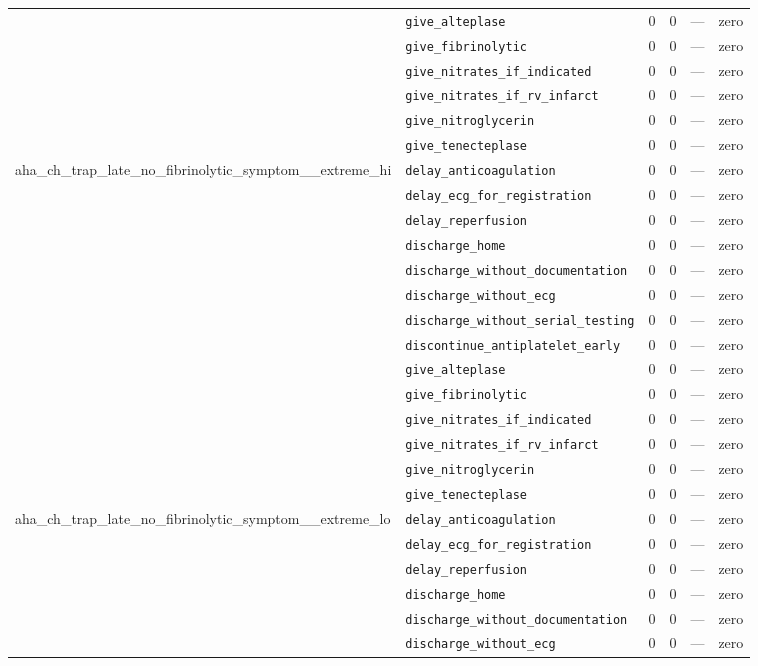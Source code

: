 \begin{table}[ht]
\begin{tabular}{llrrrl}
 & \texttt{give\_alteplase} & 0 & 0 & — & zero \\
 & \texttt{give\_fibrinolytic} & 0 & 0 & — & zero \\
 & \texttt{give\_nitrates\_if\_indicated} & 0 & 0 & — & zero \\
 & \texttt{give\_nitrates\_if\_rv\_infarct} & 0 & 0 & — & zero \\
 & \texttt{give\_nitroglycerin} & 0 & 0 & — & zero \\
 & \texttt{give\_tenecteplase} & 0 & 0 & — & zero \\
\midrule
aha\_ch\_trap\_late\_no\_fibrinolytic\_symptom\_\_extreme\_hi & \texttt{delay\_anticoagulation} & 0 & 0 & — & zero \\
 & \texttt{delay\_ecg\_for\_registration} & 0 & 0 & — & zero \\
 & \texttt{delay\_reperfusion} & 0 & 0 & — & zero \\
 & \texttt{discharge\_home} & 0 & 0 & — & zero \\
 & \texttt{discharge\_without\_documentation} & 0 & 0 & — & zero \\
 & \texttt{discharge\_without\_ecg} & 0 & 0 & — & zero \\
 & \texttt{discharge\_without\_serial\_testing} & 0 & 0 & — & zero \\
 & \texttt{discontinue\_antiplatelet\_early} & 0 & 0 & — & zero \\
 & \texttt{give\_alteplase} & 0 & 0 & — & zero \\
 & \texttt{give\_fibrinolytic} & 0 & 0 & — & zero \\
 & \texttt{give\_nitrates\_if\_indicated} & 0 & 0 & — & zero \\
 & \texttt{give\_nitrates\_if\_rv\_infarct} & 0 & 0 & — & zero \\
 & \texttt{give\_nitroglycerin} & 0 & 0 & — & zero \\
 & \texttt{give\_tenecteplase} & 0 & 0 & — & zero \\
\midrule
aha\_ch\_trap\_late\_no\_fibrinolytic\_symptom\_\_extreme\_lo & \texttt{delay\_anticoagulation} & 0 & 0 & — & zero \\
 & \texttt{delay\_ecg\_for\_registration} & 0 & 0 & — & zero \\
 & \texttt{delay\_reperfusion} & 0 & 0 & — & zero \\
 & \texttt{discharge\_home} & 0 & 0 & — & zero \\
 & \texttt{discharge\_without\_documentation} & 0 & 0 & — & zero \\
 & \texttt{discharge\_without\_ecg} & 0 & 0 & — & zero \\

\end{tabular}
\end{table}
